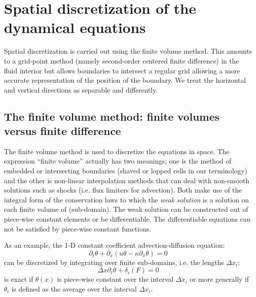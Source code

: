 
\section{Spatial discretization of the dynamical equations}

Spatial discretization is carried out using the finite volume
method. This amounts to a grid-point method (namely second-order
centered finite difference) in the fluid interior but allows
boundaries to intersect a regular grid allowing a more accurate
representation of the position of the boundary. We treat the
horizontal and vertical directions as separable and differently.




\subsection{The finite volume method: finite volumes versus finite difference}

The finite volume method is used to discretize the equations in
space. The expression ``finite volume'' actually has two meanings; one
is the method of embedded or intersecting boundaries (shaved or lopped
cells in our terminology) and the other is non-linear interpolation
methods that can deal with non-smooth solutions such as shocks
(i.e. flux limiters for advection). Both make use of the integral form
of the conservation laws to which the {\it weak solution} is a
solution on each finite volume of (sub-domain). The weak solution can
be constructed out of piece-wise constant elements or be
differentiable. The differentiable equations can not be satisfied by
piece-wise constant functions.

As an example, the 1-D constant coefficient advection-diffusion
equation:
\begin{displaymath}
\partial_t \theta + \partial_x ( u \theta - \kappa \partial_x \theta ) = 0
\end{displaymath}
can be discretized by integrating over finite sub-domains, i.e.
the lengths $\Delta x_i$:
\begin{displaymath}
\Delta x \partial_t \theta + \delta_i ( F ) = 0
\end{displaymath}
is exact if $\theta(x)$ is piece-wise constant over the interval
$\Delta x_i$ or more generally if $\theta_i$ is defined as the average
over the interval $\Delta x_i$.

